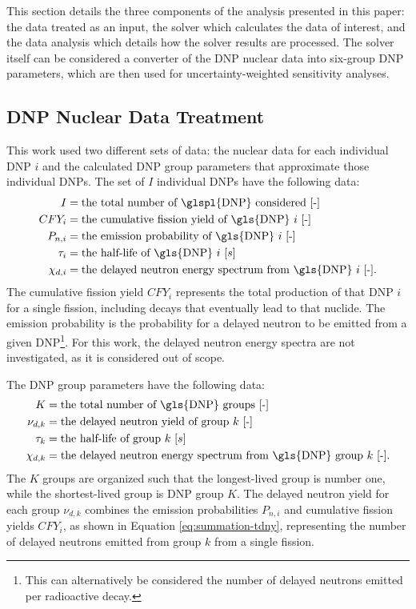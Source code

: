 \documentclass[hidelinks]{style/nseJournal}
\begin{document}
This section details the three components of the analysis presented in this paper: the data treated as an input, the solver which calculates the data of interest, and the data analysis which details how the solver results are processed.
The solver itself can be considered a converter of the \gls{DNP} nuclear data into six-group \gls{DNP} parameters, which are then used for uncertainty-weighted sensitivity analyses.

\subsection{DNP Nuclear Data Treatment}

This work used two different sets of data: the nuclear data for each individual \gls{DNP} $i$ and the calculated \gls{DNP} group parameters that approximate those individual \glspl{DNP}.
The set of $I$ individual \glspl{DNP} have the following data:
\begin{align}
    I &= \text{the total number of \glspl{DNP} considered [-]} \nonumber \\
    CFY_i &= \text{the cumulative fission yield of \gls{DNP} $i$ [-]} \nonumber \\
    P_{n,i} &= \text{the emission probability of \gls{DNP} $i$ [-]} \nonumber \\
    \tau_i &= \text{the half-life of \gls{DNP} $i$ $[s]$} \nonumber \\
    \chi_{d,i} &= \text{the delayed neutron energy spectrum from \gls{DNP} $i$ [-].} \nonumber
\end{align}
The cumulative fission yield $CFY_i$ represents the total production of that \gls{DNP} $i$ for a single fission, including decays that eventually lead to that nuclide.
The emission probability is the probability for a delayed neutron to be emitted from a given \gls{DNP}\footnote{This can alternatively be considered the number of delayed neutrons emitted per radioactive decay.}.
For this work, the delayed neutron energy spectra are not investigated, as it is considered out of scope.

The \gls{DNP} group parameters have the following data:
\begin{align}
    K &= \text{the total number of \gls{DNP} groups [-]} \nonumber \\
    \nu_{d,k} &= \text{the delayed neutron yield of group $k$ [-]} \nonumber \\
    \tau_k &= \text{the half-life of group $k$ $[s]$} \nonumber \\
    \chi_{d,k} &= \text{the delayed neutron energy spectrum from \gls{DNP} group $k$ [-].} \nonumber
\end{align}
The $K$ groups are organized such that the longest-lived group is number one, while the shortest-lived group is \gls{DNP} group $K$.
The delayed neutron yield for each group $\nu_{d,k}$ combines the emission probabilities $P_{n,i}$ and cumulative fission yields $CFY_i$, as shown in Equation \eqref{eq:summation-tdny}, representing the number of delayed neutrons emitted from group $k$ from a single fission.
\end{document}

